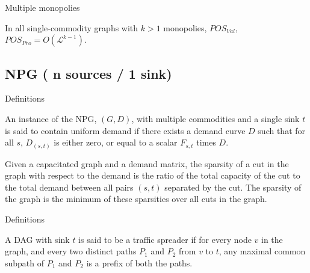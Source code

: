 \documentclass{beamer}
\begin{document}
\begin{frame}{Multiple monopolies}
  \begin{theorem}
    In all single-commodity graphs with \(k > 1\) monopolies, \(POS_{Val}\), \(POS_{Pro} = O(\mathcal{L}^{k-1})\).%
  \end{theorem}
  \center
\end{frame}


\subsection{NPG ( n sources / 1 sink)}


\begin{frame}{Definitions}
  \begin{definition}
    An instance of the NPG, $(G, D)$, with multiple commodities and
a single sink $t$ is said to contain uniform demand if there exists a demand curve
$D$ such that for all $s$, $D_{(s,t)}$ is either zero, or equal to a scalar $F_{s,t}$ times $D$.
  \end{definition}
  \begin{definition}[Sparsity]
    Given a capacitated graph and a demand matrix, the sparsity of
a cut in the graph with respect to the demand is the ratio of the total capacity
of the cut to the total demand between all pairs $(s, t)$ separated by the cut. The
sparsity of the graph is the minimum of these sparsities over all cuts in the graph.
  \end{definition}
\end{frame}
\begin{frame}{Definitions}
  \begin{definition}
    A DAG with sink $t$ is said to be a traffic spreader if for every
node $v$ in the graph, and every two distinct paths $P_1$ and $P_2$ from $v$ to $t$, any
maximal common subpath of $P_1$ and $P_2$ is a prefix of both the paths.
  \end{definition}

\end{frame}
\end{document}
